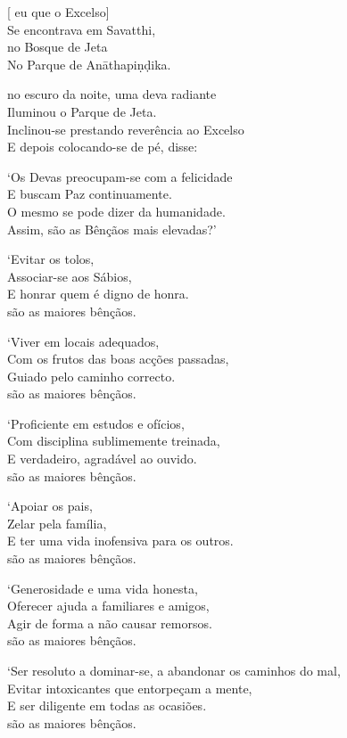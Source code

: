 [ eu  que o Excelso]\\
Se encontrava em Savatthi,\\
 no Bosque de Jeta\\
No Parque de Anāthapiṇḍika.

 no escuro da noite, uma deva radiante\\
Iluminou  o Parque de Jeta.\\
Inclinou-se prestando reverência ao Excelso\\
E depois colocando-se de pé, disse:

`Os Devas preocupam-se com a felicidade\\
E buscam Paz continuamente.\\
O mesmo se pode dizer da humanidade.\\
Assim,  são as Bênçãos mais elevadas?'

`Evitar os tolos,\\
Associar-se aos Sábios,\\
E honrar quem é digno de honra.\\
 são as maiores bênçãos.

`Viver em locais adequados,\\
Com os frutos das boas acções passadas,\\
Guiado pelo caminho correcto.\\
 são as maiores bênçãos.

\clearpage

`Proficiente em estudos e ofícios,\\
Com disciplina sublimemente treinada,\\
E  verdadeiro, agradável ao ouvido.\\
 são as maiores bênçãos.

`Apoiar os pais,\\
Zelar pela família,\\
E ter uma vida inofensiva para os outros.\\
 são as maiores bênçãos.

`Generosidade e uma vida honesta,\\
Oferecer ajuda a familiares e amigos,\\
Agir de forma a não causar remorsos.\\
 são as maiores bênçãos.

`Ser resoluto a dominar-se, a abandonar os caminhos do mal,\\
Evitar intoxicantes que entorpeçam a mente,\\
E ser diligente em todas as ocasiões.\\
 são as maiores bênçãos.

